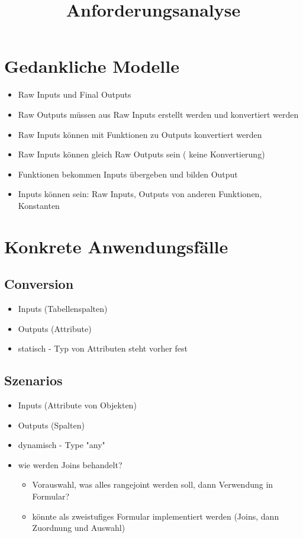 \title{Anforderungsanalyse}
\maketitle

\section*{Gedankliche Modelle}
\begin{itemize}
  \item Raw Inputs und Final Outputs
  \item Raw Outputs müssen aus Raw Inputs erstellt werden und konvertiert werden
  \item Raw Inputs können mit Funktionen zu Outputs konvertiert werden
  \item Raw Inputs können gleich Raw Outputs sein (\textrightarrow{} keine Konvertierung)
  \item Funktionen bekommen Inputs übergeben und bilden Output
  \item Inputs können sein: Raw Inputs, Outputs von anderen Funktionen, Konstanten
\end{itemize}

\section*{Konkrete Anwendungsfälle}
\subsection*{Conversion}
\begin{itemize}
  \item Inputs (Tabellenspalten)
  \item Outputs (Attribute)
  \item statisch - Typ von Attributen steht vorher fest
\end{itemize}

\subsection*{Szenarios}
\begin{itemize}
  \item Inputs (Attribute von Objekten)
  \item Outputs (Spalten)
  \item dynamisch - Type "any"
  \item wie werden Joins behandelt?
        \begin{itemize}
          \item Vorauswahl, was alles rangejoint werden soll, dann Verwendung in Formular?
          \item könnte als zweistufiges Formular implementiert werden (Joins, dann Zuordnung und Auswahl)
        \end{itemize}
\end{itemize}

